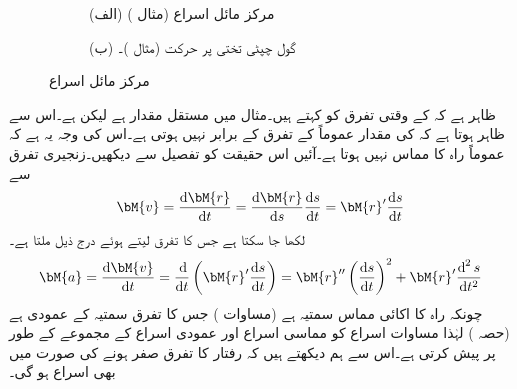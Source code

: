 \begin{figure}
\centering
\begin{subfigure}{0.5\textwidth}
\centering
{}
\caption*{(الف) مرکز مائل اسراع (مثال )}
\end{subfigure}%
\begin{subfigure}{0.5\textwidth}
\centering
{}
\caption*{(ب) گول چپٹی تختی پر حرکت (مثال )۔}
\end{subfigure}%
\caption{مرکز مائل اسراع}
\label{شکل_مثال_الاحصاء_مرکز_مائل_اسراع}
\end{figure}


ظاہر ہے کہ  کے وقتی تفرق کو  کہتے ہیں۔مثال  میں  مستقل مقدار ہے  لیکن  ہے۔اس سے ظاہر ہوتا ہے کہ  کی مقدار عموماً   کے تفرق کے برابر نہیں ہوتی ہے۔اس کی وجہ یہ ہے کہ  عموماً راہ  کا مماس نہیں ہوتا ہے۔آئیں اس حقیقت کو تفصیل سے دیکھیں۔زنجیری تفرق سے 
\begin{align*}
\bM{v}=\frac{\dif \bM{r}}{\dif t}=\frac{\dif \bM{r}}{\dif s}\frac{\dif s}{\dif t}=\bM{r}'\frac{\dif s}{\dif t}
\end{align*}
لکھا جا سکتا ہے جس کا تفرق لیتے ہوئے درج ذیل ملتا ہے۔
\begin{align}\label{مساوات_الاحصاء_اجزاء_اسراع}
\bM{a}=\frac{\dif \bM{v}}{\dif t}=\frac{\dif}{\dif t}\left(\bM{r}'\frac{\dif s}{\dif t}\right)=\bM{r}''\left(\frac{\dif s}{\dif t}\right)^2+\bM{r}'\frac{\dif^{\,2} s}{\dif t^2}
\end{align}
چونکہ  راہ  کا اکائی مماس سمتیہ  ہے (مساوات ) جس کا تفرق  سمتیہ   کے عمودی ہے (حصہ ) لہٰذا مساوات  اسراع کو مماسی اسراع  اور عمودی اسراع  کے مجموعے کے طور پر پیش کرتی ہے۔اس سے ہم دیکھتے ہیں کہ رفتار کا تفرق صفر ہونے کی صورت  میں بھی اسراع ہو گی۔

